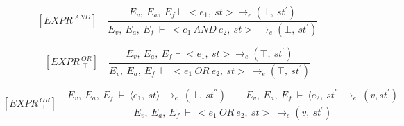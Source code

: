 	\[	
	[EXPR^{\ AND}_{\ \ \bot}] \quad	
	\dfrac{E_v, \ E_a, \ E_f \vdash <e_1, \ st> \rightarrow_e (\bot, \ st^{'}) }{E_v, \ E_a, \ E_f \ \vdash \ <e_1 \ AND \ e_2, \ st> \ \rightarrow_e (\bot, \ st^{'})}	
	\]
	
	
	
	
	
	
	
	
	\[	
	[EXPR^{\ OR}_{\ \ \top}] \quad	
	\dfrac{E_v, \ E_a, \ E_f \vdash <e_1, \ st> \rightarrow_e (\top, \ st^{'}) }{E_v, \ E_a, \ E_f \ \vdash \ <e_1 \ OR \ e_2, \ st> \ \rightarrow_e (\top, \ st^{'})}	
	\]
	
	
	
	
	
	\[	
	[EXPR^{\ OR}_{\ \ \bot}] \quad	
	\dfrac{E_v, \ E_a, \ E_f \ \vdash \ \langle e_1, \ st \rangle \ \rightarrow_e \ (\bot, \ st^{''}) \qquad E_v, \ E_a, \ E_f \ \vdash \ \langle e_2, \ st^{''} \ \rightarrow_e \ (v, st^{'})}{E_v, \ E_a, \ E_f \ \vdash \ <e_1 \ OR \ e_2, \ st> \ \rightarrow_e (v, \ st^{'})}
	\]
	
	
	
	
	
	
	
	
	
	
	
	
	
